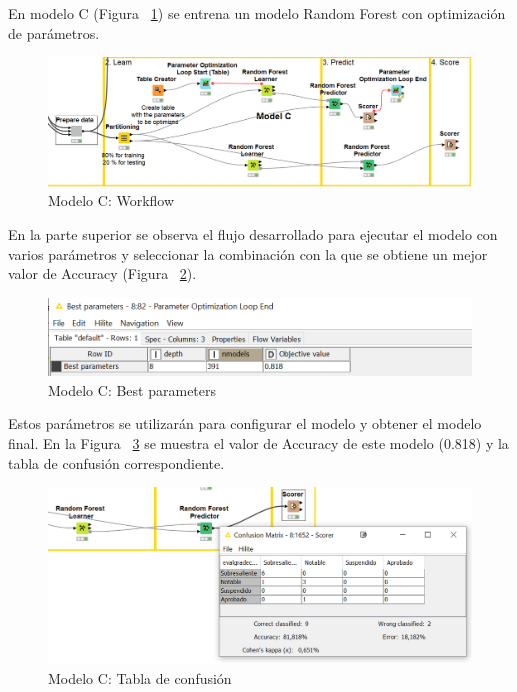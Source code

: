 En modelo C (Figura ~\ref{fig:workflowC1}) se entrena un modelo Random Forest con optimización de parámetros. 

\begin{figure}[!htb]
	\centering
	\includegraphics[width=1\textwidth]{img/workflowC1.png}
	\caption{Modelo C: Workflow}
	\label{fig:workflowC1}
\end{figure}
\FloatBarrier

En la parte superior se observa el flujo desarrollado para ejecutar el modelo con varios parámetros y seleccionar la combinación con la 
que se obtiene un mejor valor de Accuracy (Figura ~\ref{fig:workflowC2}). 

\begin{figure}[!htb]
	\centering
	\includegraphics[width=1\textwidth]{img/workflowC2.png}
	\caption{Modelo C: Best parameters}
	\label{fig:workflowC2}
\end{figure}
\FloatBarrier

Estos parámetros se utilizarán para configurar el modelo y obtener el modelo final. En la Figura ~\ref{fig:workflowC3} se muestra
el valor de Accuracy de este modelo (0.818) y la tabla de confusión correspondiente. 

\begin{figure}[!htb]
	\centering
	\includegraphics[width=1\textwidth]{img/workflowC3.png}
	\caption{Modelo C: Tabla de confusión}
	\label{fig:workflowC3}
\end{figure}
\FloatBarrier

